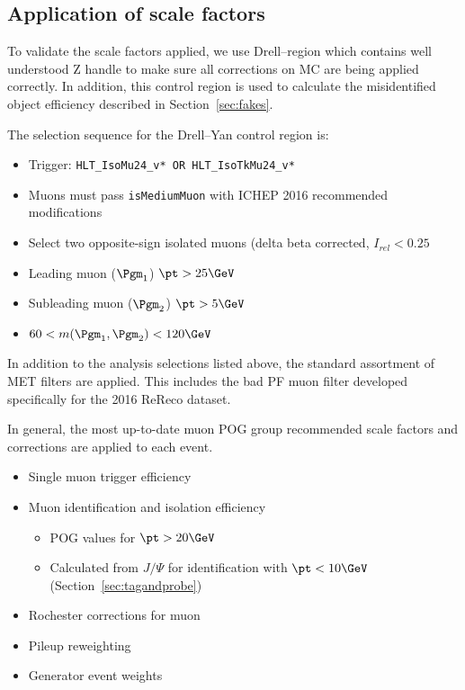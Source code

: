 \subsection{Application of scale factors\label{sec:controlregions}}


To validate the scale factors applied, we use Drell--region which contains well understood Z handle to make sure all corrections on MC are being applied correctly. 
In addition, this control region is used to calculate the
misidentified object efficiency described in Section~\ref{sec:fakes}.

The selection sequence for the Drell--Yan control region is:
\begin{itemize}
    \item Trigger: \verb|HLT_IsoMu24_v* OR HLT_IsoTkMu24_v*|
    \item Muons must pass \verb|isMediumMuon| with ICHEP 2016 recommended modifications
    \item Select two opposite-sign isolated muons (delta beta corrected, $I_{rel} < 0.25$
    \item Leading muon ($\Pgm_1$) $\pt > 25 \GeV$
    \item Subleading muon ($\Pgm_2$) $\pt > 5 \GeV$
    \item $60 < m(\Pgm_1, \Pgm_2) < 120 \GeV$
\end{itemize}

In addition to the analysis selections listed above,
the standard assortment of MET filters are applied.
This includes the bad PF muon filter developed specifically
for the 2016 ReReco dataset.

In general, the most up-to-date muon POG group recommended
scale factors and corrections are applied to each event. 
\begin{itemize}
    \item Single muon trigger efficiency~\cite{muonpog:efficiencies}
    \item Muon identification and isolation efficiency
    \begin{itemize}
        \item POG values for $\pt > 20 \GeV$~\cite{muonpog:efficiencies}
        \item Calculated from $J/\Psi$ for identification with $\pt < 10 \GeV$ (Section~\ref{sec:tagandprobe})
    \end{itemize}
    \item Rochester corrections for muon \pt~\cite{muonpog:rochester}
    \item Pileup reweighting~\cite{lumipog:pileup}
    \item Generator event weights
\end{itemize}

